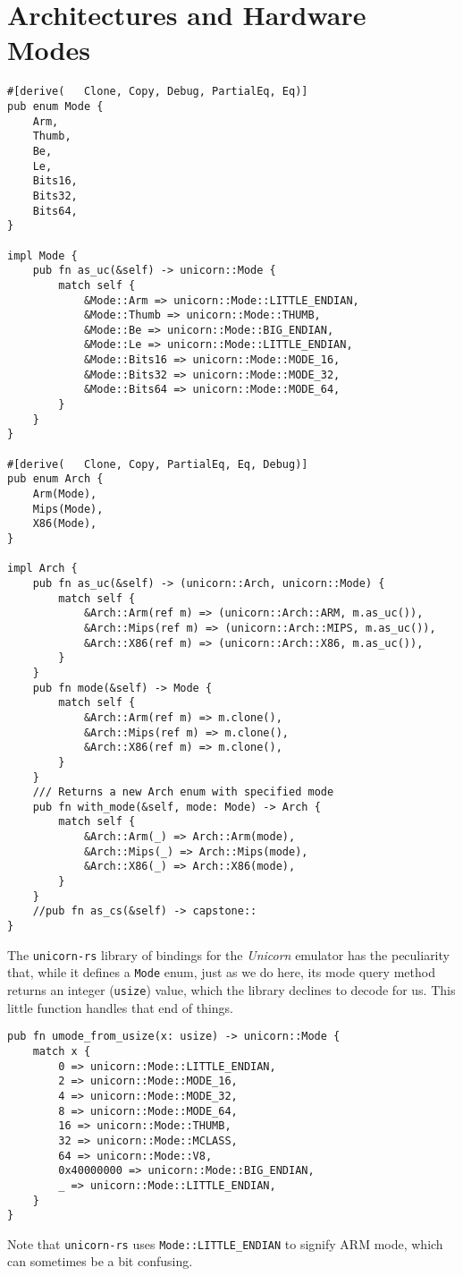 \documentclass[11pt]{article}
\begin{document}
\section{Architectures and Hardware Modes}
\label{sec:org76c3cb0}

\lstset{language=rust,label=org4e6a878,caption= ,captionpos=b,numbers=none}
\begin{lstlisting}
#[derive(   Clone, Copy, Debug, PartialEq, Eq)]
pub enum Mode {
    Arm,
    Thumb,
    Be,
    Le,
    Bits16,
    Bits32,
    Bits64,
}

impl Mode {
    pub fn as_uc(&self) -> unicorn::Mode {
        match self {
            &Mode::Arm => unicorn::Mode::LITTLE_ENDIAN,
            &Mode::Thumb => unicorn::Mode::THUMB,
            &Mode::Be => unicorn::Mode::BIG_ENDIAN,
            &Mode::Le => unicorn::Mode::LITTLE_ENDIAN,
            &Mode::Bits16 => unicorn::Mode::MODE_16,
            &Mode::Bits32 => unicorn::Mode::MODE_32,
            &Mode::Bits64 => unicorn::Mode::MODE_64,
        }
    }
}

#[derive(   Clone, Copy, PartialEq, Eq, Debug)]
pub enum Arch {
    Arm(Mode),
    Mips(Mode),
    X86(Mode),
}

impl Arch {
    pub fn as_uc(&self) -> (unicorn::Arch, unicorn::Mode) {
        match self {
            &Arch::Arm(ref m) => (unicorn::Arch::ARM, m.as_uc()),
            &Arch::Mips(ref m) => (unicorn::Arch::MIPS, m.as_uc()),
            &Arch::X86(ref m) => (unicorn::Arch::X86, m.as_uc()),
        }
    }
    pub fn mode(&self) -> Mode {
        match self {
            &Arch::Arm(ref m) => m.clone(),
            &Arch::Mips(ref m) => m.clone(),
            &Arch::X86(ref m) => m.clone(),
        }
    }
    /// Returns a new Arch enum with specified mode
    pub fn with_mode(&self, mode: Mode) -> Arch {
        match self {
            &Arch::Arm(_) => Arch::Arm(mode),
            &Arch::Mips(_) => Arch::Mips(mode),
            &Arch::X86(_) => Arch::X86(mode),
        }
    }
    //pub fn as_cs(&self) -> capstone::
}
\end{lstlisting}


The \texttt{unicorn-rs} library of bindings for the \emph{Unicorn} emulator has
the peculiarity that, while it defines a \texttt{Mode} enum, just as we do
here, its mode query method returns an integer (\texttt{usize}) value, which
the library declines to decode for us. This little function handles
that end of things.
\lstset{language=rust,label=orgf7f9902,caption= ,captionpos=b,numbers=none}
\begin{lstlisting}
pub fn umode_from_usize(x: usize) -> unicorn::Mode {
    match x {
        0 => unicorn::Mode::LITTLE_ENDIAN,
        2 => unicorn::Mode::MODE_16,
        4 => unicorn::Mode::MODE_32,
        8 => unicorn::Mode::MODE_64,
        16 => unicorn::Mode::THUMB,
        32 => unicorn::Mode::MCLASS,
        64 => unicorn::Mode::V8,
        0x40000000 => unicorn::Mode::BIG_ENDIAN,
        _ => unicorn::Mode::LITTLE_ENDIAN,
    }
}
\end{lstlisting}
Note that \texttt{unicorn-rs} uses \texttt{Mode::LITTLE\_ENDIAN} to signify ARM mode,
which can sometimes be a bit confusing.
\end{document}

